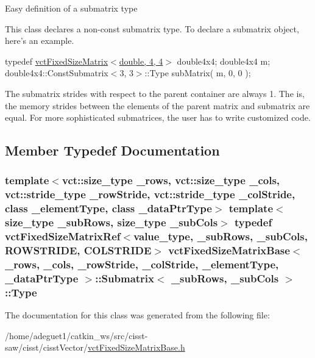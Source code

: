 Easy definition of a submatrix type

This class declares a non-\/const submatrix type. To declare a submatrix object, here's an example.

typedef \hyperlink{classvct_fixed_size_matrix}{vct\-Fixed\-Size\-Matrix$<$double, 4, 4$>$} double4x4; double4x4 m; double4x4\-::\-Const\-Submatrix$<$3, 3$>$\-::\-Type sub\-Matrix( m, 0, 0 );

The submatrix strides with respect to the parent container are always 1. The is, the memory strides between the elements of the parent matrix and submatrix are equal. For more sophisticated submatrices, the user has to write customized code. 

\subsection{Member Typedef Documentation}
\hypertarget{classvct_fixed_size_matrix_base_1_1_submatrix_a0159859a38f45bd4a73c8202e573b6bd}{
\subsubsection[{Type}]{\setlength{\rightskip}{0pt plus 5cm}template$<$vct\-::size\-\_\-type \-\_\-rows, vct\-::size\-\_\-type \-\_\-cols, vct\-::stride\-\_\-type \-\_\-row\-Stride, vct\-::stride\-\_\-type \-\_\-col\-Stride, class \-\_\-element\-Type, class \-\_\-data\-Ptr\-Type$>$ template$<$size\-\_\-type \-\_\-sub\-Rows, size\-\_\-type \-\_\-sub\-Cols$>$ typedef {\bf vct\-Fixed\-Size\-Matrix\-Ref}$<$value\-\_\-type, \-\_\-sub\-Rows, \-\_\-sub\-Cols, {\bf R\-O\-W\-S\-T\-R\-I\-D\-E}, {\bf C\-O\-L\-S\-T\-R\-I\-D\-E}$>$ {\bf vct\-Fixed\-Size\-Matrix\-Base}$<$ \-\_\-rows, \-\_\-cols, \-\_\-row\-Stride, \-\_\-col\-Stride, \-\_\-element\-Type, \-\_\-data\-Ptr\-Type $>$\-::{\bf Submatrix}$<$ \-\_\-sub\-Rows, \-\_\-sub\-Cols $>$\-::{\bf Type}}}\label{classvct_fixed_size_matrix_base_1_1_submatrix_a0159859a38f45bd4a73c8202e573b6bd}


The documentation for this class was generated from the following file\-:\begin{DoxyCompactItemize}
\item 
/home/adeguet1/catkin\-\_\-ws/src/cisst-\/saw/cisst/cisst\-Vector/\hyperlink{vct_fixed_size_matrix_base_8h}{vct\-Fixed\-Size\-Matrix\-Base.\-h}\end{DoxyCompactItemize}
